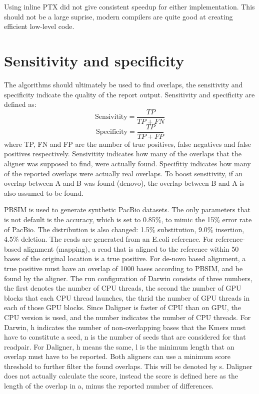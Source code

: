 \documentclass[../main/thesis.tex]{subfiles}
\begin{document}
Using inline PTX did not give consistent speedup for either implementation.
This should not be a large suprise, modern compilers are quite good at creating efficient low-level code.


\section{Sensitivity and specificity}
The algorithms should ultimately be used to find overlaps, the sensitivity and specificity indicate the quality of the report output.
Sensitivity and specificity are defined as:
$$\text{Sensivitity} = \frac{TP}{TP + FN}$$
$$\text{Specificity} = \frac{TP}{TP + FP}$$
where TP, FN and FP are the number of true positives, false negatives and false positives respectively.
Sensivitity indicates how many of the overlaps that the aligner was supposed to find, were actually found.
Specifitiy indicates how many of the reported overlaps were actually real overlaps.
To boost sensitivity, if an overlap between A and B was found (denovo), the overlap between B and A is also assumed to be found.

PBSIM \cite{PBSIM} is used to generate synthetic PacBio datasets.
The only parameters that is not default is the accuracy, which is set to 0.85\%, to mimic the 15\% error rate of PacBio.
The distribution is also changed: 1.5\% substitution, 9.0\% insertion, 4.5\% deletion.
The reads are generated from an E.coli reference.
For reference-based alignment (mapping), a read that is aligned to the reference within 50 bases of the original location is a true positive.
For de-novo based alignment, a true positive must have an overlap of 1000 bases according to PBSIM, and be found by the aligner.
The run configuration of Darwin consists of three numbers, the first denotes the number of CPU threads, the second the number of GPU blocks that each CPU thread launches, the thrid the number of GPU threads in each of those GPU blocks.
Since Daligner is faster of CPU than on GPU, the CPU version is used, and the number indicates the number of CPU threads.
For Darwin, h indicates the number of non-overlapping bases that the Kmers must have to constitute a seed, n is the number of seeds that are considered for that readpair.
For Daligner, h means the same, l is the minimum length that an overlap must have to be reported.
Both aligners can use a minimum score threshold to further filter the found overlaps.
This will be denoted by s.
Daligner does not actually calculate the score, instead the score is defined here as the length of the overlap in a, minus the reported number of differences.
\end{document}
